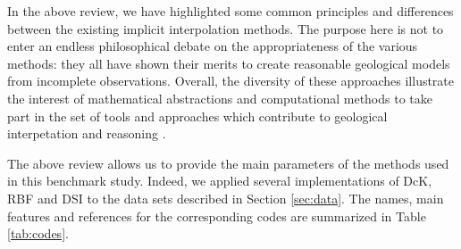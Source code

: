 \documentclass[final]{ring20}
\begin{document}
{In the above review, we have highlighted some common principles and differences between the existing implicit interpolation methods. The purpose here is not to enter an endless philosophical debate on the appropriateness of the various methods: they all have shown their merits to create reasonable geological models from incomplete observations. Overall, the diversity of these approaches illustrate the interest of mathematical abstractions and computational methods to take part in the set of tools and approaches which contribute to geological interpetation and reasoning \citep{frodeman_geological_1995}. %

The above review allows us to provide the main parameters of the methods used in this benchmark study. Indeed, we applied several implementations of DcK, RBF and DSI to the data sets described in Section \ref{sec:data}. The names, main features and references 
for the corresponding codes are summarized in Table \ref{tab:codes}. 

}
\end{document}
